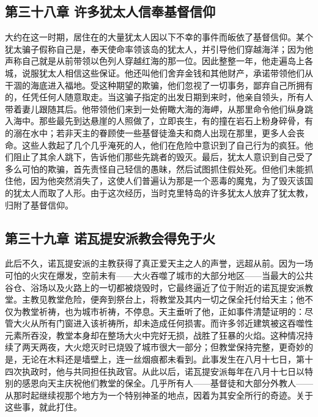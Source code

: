 
\subsection{第三十八章 许多犹太人信奉基督信仰}

大约在这一时期，居住在的大量犹太人因以下不幸的事件而皈依了基督信仰。某个犹太骗子假称自己是，奉天使命率领该岛的犹太人，并引导他们穿越海洋；因为他声称自己就是从前带领以色列人穿越红海的那一位。因此整整一年，他走遍岛上各城，说服犹太人相信这些保证。他还叫他们舍弃金钱和其他财产，承诺带领他们从干涸的海底进入福地。受这种期望的欺骗，他们忽视了一切事务，鄙弃自己所拥有的，任凭任何人随意取走。当这骗子指定的出发日期到来时，他亲自领头，所有人带着妻儿跟随其后。他带领他们来到一处俯瞰大海的海岬，从那里命令他们纵身跳入海中。那些最先到达悬崖的人照做了，立即丧生，有的撞在岩石上粉身碎骨，有的溺在水中；若非天主的眷顾使一些基督徒渔夫和商人出现在那里，更多人会丧命。这些人救起了几个几乎淹死的人，他们在危险中意识到了自己行为的疯狂。他们阻止了其余人跳下，告诉他们那些先跳者的毁灭。最后，犹太人意识到自己受了多么可怕的欺骗，首先责怪自己轻信的愚昧，然后试图抓住假处死。但他们未能抓住他，因为他突然消失了，这使人们普遍认为那是一个恶毒的魔鬼，为了毁灭该国的犹太人而取了人形。由于这次经历，当时克里特岛的许多犹太人放弃了犹太教，归附了基督信仰。\par


\subsection{第三十九章 诺瓦提安派教会得免于火}

此后不久，诺瓦提安派的主教获得了真正爱天主之人的声誉，远超从前。因为一场可怕的火灾在爆发，空前未有——大火吞噬了城市的大部分地区——当最大的公共谷仓、浴场以及火路上的一切都被烧毁时，它最终逼近了位于附近的诺瓦提安派教堂。主教见教堂危险，便奔到祭台上，将教堂及其内一切之保全托付给天主；他不仅为教堂祈祷，也为城市祈祷，不停息。天主垂听了他，正如事件清楚证明的：尽管大火从所有门窗进入该祈祷所，却未造成任何损害。而许多邻近建筑被这吞噬性元素所吞没，教堂本身却在整场大火中完好无损，战胜了狂暴的火焰。这种情况持续了两天两夜，大火熄灭时已烧毁了城市很大一部分；但教堂保持完整，更奇妙的是，无论在木料还是墙壁上，连一丝烟痕都未看到。此事发生在八月十七日，第十四次执政时，他与共同担任执政官。从此以后，诺瓦提安派每年在八月十七日以特别的感恩向天主庆祝他们教堂的保全。几乎所有人——基督徒和大部分外教人——从那时起继续视那个地方为一个特别神圣的地点，因着为其安全所行的奇迹。关于这些事，就此打住。\par


